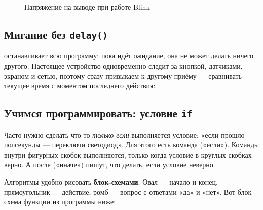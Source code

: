 \begin{figure}[H]
\centering
{}
\caption{Напряжение на выводе при работе Blink}
\end{figure}

\subsection{Мигание без \texttt{delay()}}

 останавливает всю программу: пока идёт ожидание, она не может делать ничего другого.
Настоящее устройство одновременно следит за кнопкой, датчиками, экраном и сетью, поэтому сразу
привыкаем к другому приёму --- сравнивать текущее время  с моментом последнего действия:


\subsection{Учимся программировать: условие \texttt{if}}

Часто нужно сделать что-то \emph{только если} выполняется условие: «если прошло полсекунды --- переключи
светодиод». Для этого есть команда  («если»). Команды внутри фигурных скобок выполняются, только
когда условие в круглых скобках верно. А после  («иначе») пишут, что делать, если условие неверно.

Алгоритмы удобно рисовать \textbf{блок-схемами}. Овал --- начало и конец, прямоугольник --- действие,
ромб --- вопрос с ответами «да» и «нет». Вот блок-схема функции  из программы ниже:

